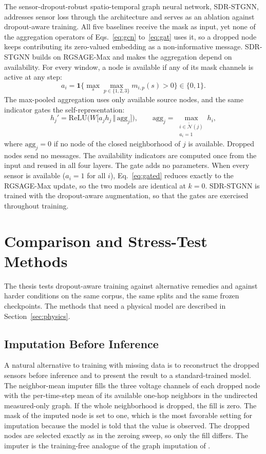 \documentclass[MTech]{ugthesis}
\begin{document}
The sensor-dropout-robust spatio-temporal graph neural network, \ac{SDR-STGNN}, addresses sensor loss through the architecture and serves as an ablation against dropout-aware training. All five baselines receive the mask as input, yet none of the aggregation operators of Eqs.~\eqref{eq:gcn} to~\eqref{eq:gat} uses it, so a dropped node keeps contributing its zero-valued embedding as a non-informative message. \ac{SDR-STGNN} builds on RGSAGE-Max and makes the aggregation depend on availability. For every window, a node is available if any of its mask channels is active at any step:
\begin{equation}
a_i=\mathbf{1}\Big\{\max_{s}\max_{p\in\{1,2,3\}}m_{i,p}(s)>0\Big\}\in\{0,1\}.
\label{eq:avail}
\end{equation}
The max-pooled aggregation uses only available source nodes, and the same indicator gates the self-representation:
\begin{equation}
h_j'=\mathrm{ReLU}\Big(W\big[a_j h_j\,\Vert\,\mathrm{agg}_j\big]\Big),\qquad
\mathrm{agg}_j=\max_{\substack{i\in\tilde{\mathcal{N}}(j)\\a_i=1}}h_i,
\label{eq:gated}
\end{equation}
where $\mathrm{agg}_j=0$ if no node of the closed neighborhood of $j$ is available. Dropped nodes send no messages. The availability indicators are computed once from the input and reused in all four layers. The gate adds no parameters. When every sensor is available ($a_i=1$ for all $i$), Eq.~\eqref{eq:gated} reduces exactly to the RGSAGE-Max update, so the two models are identical at $k=0$. \ac{SDR-STGNN} is trained with the dropout-aware augmentation, so that the gates are exercised throughout training.

\section{Comparison and Stress-Test Methods}
\label{sec:stress}

The thesis tests dropout-aware training against alternative remedies and against harder conditions on the same corpus, the same splits and the same frozen checkpoints. The methods that need a physical model are described in Section~\ref{sec:physics}.


\subsection{Imputation Before Inference}

A natural alternative to training with missing data is to reconstruct the dropped sensors before inference and to present the result to a standard-trained model. The neighbor-mean imputer fills the three voltage channels of each dropped node with the per-time-step mean of its available one-hop neighbors in the undirected measured-only graph. If the whole neighborhood is dropped, the fill is zero. The mask of the imputed node is set to one, which is the most favorable setting for imputation because the model is told that the value is observed. The dropped nodes are selected exactly as in the zeroing sweep, so only the fill differs. The imputer is the training-free analogue of the graph imputation of \citet{zhang2025}.
\end{document}
